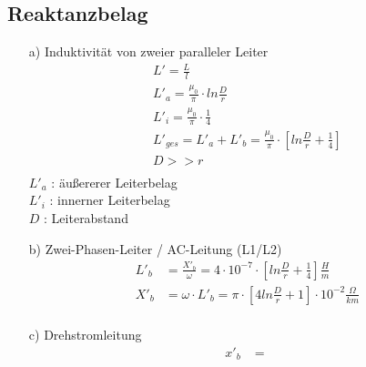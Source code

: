 \subsection{Reaktanzbelag}
\begin{enumerate}
    \item[a)]{Induktivität von zweier paralleler Leiter}
        \begin{gather*}
            L'=\frac{L}{l}\\
            L'_{a} = \frac{\mu_0}{\pi}\cdot ln\frac{D}{r}\\
            L'_{i} = \frac{\mu_0}{\pi} \cdot \frac{1}{4}\\
            L'_{ges} = L'_a + L'_b = \frac{\mu_0}{\pi} \cdot [ln \frac{D}{r} +\frac{1}{4}] \\D>>r\\
        \end{gather*}
    $L'_a$ : äußererer Leiterbelag\\
    $L'_i$ : innerner Leiterbelag\\
    $D$ : Leiterabstand
    
    \item[b)]{Zwei-Phasen-Leiter / AC-Leitung (L1/L2)}
        \begin{align*}
            L'_b&=\frac{X'_b}{\omega}=4\cdot 10^{-7}\cdot [ln\frac{D}{r}+\frac{1}{4}]\frac{H}{m}\\
            X'_b&=\omega \cdot L'_b = \pi \cdot [4 ln \frac{D}{r}+1]\cdot 10^{-2} \frac{\Omega}{km}\\
        \end{align*}
    \item[c)]{Drehstromleitung}
        \begin{align*}
            x'_b&=\frac{}{}
        \end{align*}
    

\end{enumerate}







